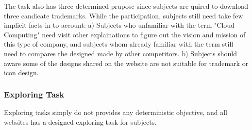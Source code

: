 \begin{itemize}
        The task also has three determined prupose since subjects are quired to download three candicate trademarks.
        While the participation, subjects still need take few implicit facts in to account:
        a) Subjects who unfamiliar with the term "Cloud Computing" need visit other explainations to figure out
        the vision and mission of this type of company, and subjects whom already familiar with the term
        still need to compares the designed made by other competitors.
        b) Subjects should aware some of the designs shared on the website are not suitable for trademark or icon design.
\end{itemize}

\subsubsection{Exploring Task}

Exploring tasks simply do not provides any deterministic objective,
and all websites has a designed exploring task for subjects.

